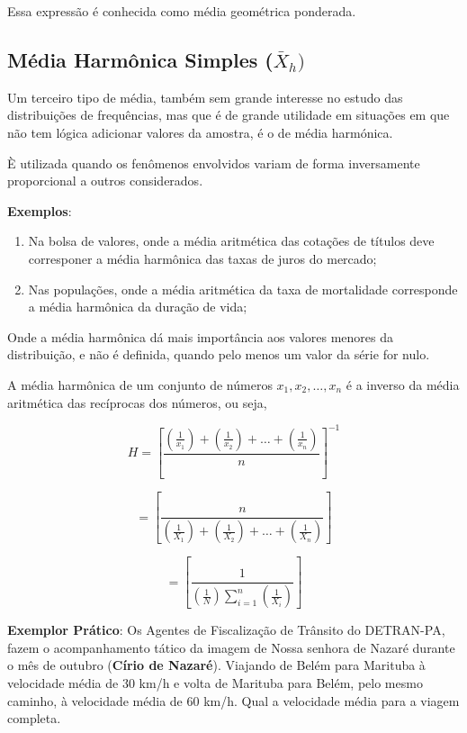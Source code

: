 Essa expressão é conhecida como média geométrica ponderada.


\subsection{Média Harmônica Simples ($\bar{X}_{h})$}

Um terceiro tipo de média, também sem grande interesse no estudo das
distribuições de frequências, mas que é de grande utilidade em situações em que não
tem lógica adicionar valores da amostra, é o de média harmónica.\vskip0.3cm



È utilizada quando os fenômenos envolvidos variam de forma inversamente proporcional a outros considerados.\vskip0.3cm

\textbf{Exemplos}:
\begin{enumerate}
  \item Na bolsa de valores, onde a média aritmética das cotações de títulos deve corresponer a média harmônica das taxas de juros do mercado;
  \item Nas populações, onde a média aritmética da taxa de mortalidade corresponde a média harmônica da duração de vida;
\end{enumerate}

Onde a média harmônica dá mais importância aos valores menores da distribuição, e não é definida, quando pelo menos um valor da série for nulo.\vskip0.3cm


A média harmônica de um conjunto de números $x_{1},x_{2},\ldots,x_{n}$ é a inverso da média
aritmética das recíprocas dos números, ou seja,


\begin{equation}\label{harmonica1}
H= \left[ \frac{  (\frac{1}{x_{1}})+(\frac{1}{x_{2}})+\ldots+(\frac{1}{x_{n}})  }{n} \right ]  ^{-1} 
\end{equation}

\begin{equation*}\label{harmonica1}
 =\left[  \frac{n}{(\frac{1}{X_{1}})+(\frac{1}{X_{2}})+\ldots+(\frac{1}{X_{n}})}  \right ]
\end{equation*}

\begin{equation*}\label{harmonica}
=\left[  \frac{1}{ (\frac{1}{N}) \sum_{i=1}^{n} (\frac{1}{X_{i}}) } \right ]
\end{equation*}
\vskip0.3cm

\textbf{Exemplor Prático}: Os Agentes de Fiscalização de Trânsito do DETRAN-PA, fazem o acompanhamento tático da imagem de Nossa senhora de Nazaré durante o mês de outubro (\textbf{Círio de Nazaré}). Viajando de Belém para Marituba à velocidade média de 30 km/h e volta de Marituba para Belém, pelo mesmo caminho, à velocidade média de 60 km/h. Qual a velocidade média para a viagem completa.

